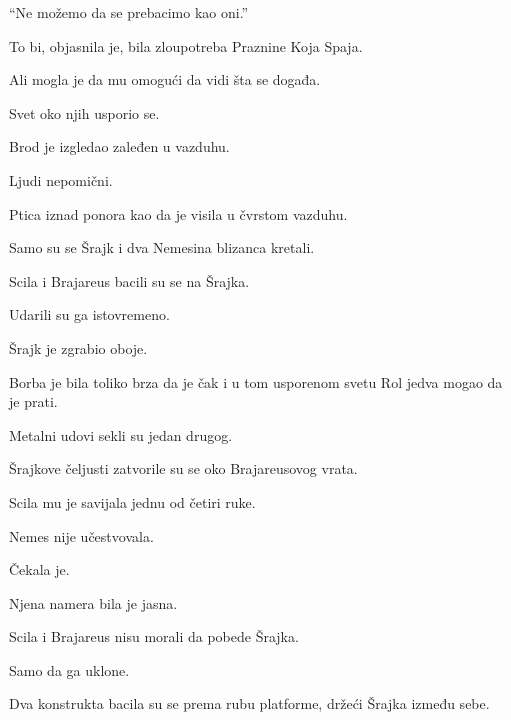 \bigskip

``Ne možemo da se prebacimo kao oni.''

\bigskip

To bi, objasnila je, bila zloupotreba Praznine Koja Spaja.

\bigskip

Ali mogla je da mu omogući da vidi šta se događa.

\bigskip

Svet oko njih usporio se.

\bigskip

Brod je izgledao zaleđen u vazduhu.

Ljudi nepomični.

Ptica iznad ponora kao da je visila u čvrstom vazduhu.

\bigskip

Samo su se Šrajk i dva Nemesina blizanca kretali.

\bigskip

Scila i Brajareus bacili su se na Šrajka.

\bigskip

Udarili su ga istovremeno.

\bigskip

Šrajk je zgrabio oboje.

\bigskip

Borba je bila toliko brza da je čak i u tom usporenom svetu Rol jedva mogao da je prati.

\bigskip

Metalni udovi sekli su jedan drugog.

Šrajkove čeljusti zatvorile su se oko Brajareusovog vrata.

Scila mu je savijala jednu od četiri ruke.

\bigskip

Nemes nije učestvovala.

\bigskip

Čekala je.

\bigskip

Njena namera bila je jasna.

\bigskip

Scila i Brajareus nisu morali da pobede Šrajka.

\bigskip

Samo da ga uklone.

\bigskip

Dva konstrukta bacila su se prema rubu platforme, držeći Šrajka između sebe.

\bigskip

